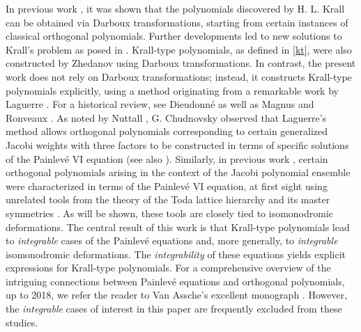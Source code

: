 \documentclass[10pt, reqno]{amsart}
\numberwithin{equation}{section}
\numberwithin{equation}{section}
\begin{document}
In previous work \cite{GH1}, it was shown that the polynomials discovered by H. L. Krall \cite{K2} can be obtained via Darboux transformations, starting from certain instances of classical orthogonal polynomials. Further developments \cite{GHH, GY, H, I1, I2} led to new solutions to Krall's problem as posed in \cite{K1}. Krall-type polynomials, as defined in \eqref{kt}, were also constructed by Zhedanov \cite{Zh} using Darboux transformations. In contrast, the present work does not rely on Darboux transformations; instead, it constructs Krall-type polynomials explicitly, using a method originating from a remarkable work by Laguerre \cite{La}. For a historical review, see Dieudonné \cite{Di} as well as Magnus and Ronveaux \cite{MR}. As noted by Nuttall \cite{N}, G. Chudnovsky observed that Laguerre's method allows orthogonal polynomials corresponding to certain generalized Jacobi weights with three factors to be constructed in terms of specific solutions of the Painlevé VI equation (see also \cite{CC, M}). Similarly, in previous work \cite{HS}, certain orthogonal polynomials arising in the context of the Jacobi polynomial ensemble were characterized in terms of the Painlevé VI equation, at first sight using unrelated tools from the theory of the Toda lattice hierarchy and its master symmetries \cite{AVM, Da, FG}. As will be shown, these tools are closely tied to isomonodromic deformations. The central result of this work is that Krall-type polynomials lead to \emph{integrable} cases of the Painlevé equations and, more generally, to \emph{integrable} isomonodromic deformations. The \emph{integrability} of these equations yields explicit expressions for Krall-type polynomials. For a comprehensive overview of the intriguing connections between Painlevé equations and orthogonal polynomials, up to 2018, we refer the reader to Van Assche's excellent monograph \cite{V}. However, the \emph{integrable} cases of interest in this paper are frequently excluded from these studies. 
\end{document}
